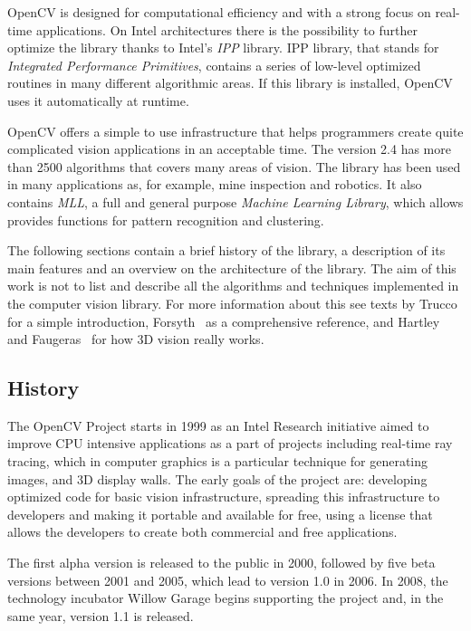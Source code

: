 	\mbox{OpenCV} is designed for computational efficiency and with a strong focus on real-time applications. On Intel architectures there is the possibility to further optimize the library thanks to Intel's \emph{IPP} library. IPP library, that stands for \emph{Integrated Performance Primitives}, contains a series of low-level optimized routines in many different algorithmic areas. If this library is installed, \mbox{OpenCV} uses it automatically at runtime.

	\mbox{OpenCV} offers a simple to use infrastructure that helps programmers create quite complicated vision applications in an acceptable time. The version 2.4 has more than 2500 algorithms that covers many areas of vision. The library has been used in many applications as, for example, mine inspection and robotics. 
	It also contains \emph{MLL}, a full and general purpose \emph{Machine Learning Library}, which allows provides functions for pattern recognition and clustering\cite{bradski2008learning}. 

	The following sections contain a brief history of the library, a description of its main features and an overview on the architecture of the library. The aim of this work is not to list and describe all the algorithms and techniques implemented in the computer vision library. For more information about this see texts by Trucco~\cite{trucco1998introductory} for a simple introduction, Forsyth~\cite{forsyth2011computer} as a comprehensive reference, and Hartley~\cite{hartley2003multiple} and Faugeras~\cite{faugeras1993three} for how 3D vision really works.




	
	\subsection{History}
	The \mbox{OpenCV} Project starts in 1999 as an Intel Research initiative aimed to improve CPU intensive applications as a part of projects including real-time ray tracing, which in computer graphics is a particular technique for generating images, and 3D display walls. The early goals of the project are: developing optimized code for basic vision infrastructure, spreading this infrastructure to developers and making it portable and available for free, using a license that allows the developers to create both commercial and free applications.

	The first alpha version is released to the public in 2000, followed by five beta versions between 2001 and 2005, which lead to version 1.0 in 2006. In 2008, the technology incubator Willow Garage begins supporting the project and, in the same year, version 1.1  is released.

